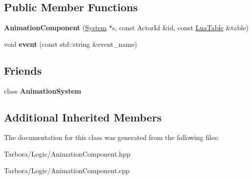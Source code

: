 \subsection*{Public Member Functions}
\begin{DoxyCompactItemize}
\item 
\mbox{\label{classTarbora_1_1AnimationComponent_a80c77d7fedaca33e0ae0898da08bcf2b}} 
{\bfseries Animation\+Component} (\hyperlink{classTarbora_1_1System}{System} $\ast$s, const Actor\+Id \&id, const \hyperlink{classTarbora_1_1LuaTable}{Lua\+Table} \&table)
\item 
\mbox{\label{classTarbora_1_1AnimationComponent_a9486fb8b2f208150242a479ca9bf7164}} 
void {\bfseries event} (const std\+::string \&event\+\_\+name)
\end{DoxyCompactItemize}
\subsection*{Friends}
\begin{DoxyCompactItemize}
\item 
\mbox{\label{classTarbora_1_1AnimationComponent_a4c8fb761c777f1a874c5d97e052686ad}} 
class {\bfseries Animation\+System}
\end{DoxyCompactItemize}
\subsection*{Additional Inherited Members}


The documentation for this class was generated from the following files\+:\begin{DoxyCompactItemize}
\item 
Tarbora/\+Logic/Animation\+Component.\+hpp\item 
Tarbora/\+Logic/Animation\+Component.\+cpp\end{DoxyCompactItemize}
